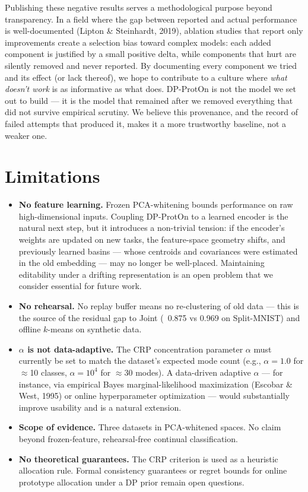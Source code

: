 \documentclass[11pt,a4paper]{article}
\begin{document}
Publishing these negative results serves a methodological purpose beyond transparency. In a field where the gap between reported and actual performance is well-documented (Lipton \& Steinhardt, 2019), ablation studies that report only improvements create a selection bias toward complex models: each added component is justified by a small positive delta, while components that hurt are silently removed and never reported. By documenting every component we tried and its effect (or lack thereof), we hope to contribute to a culture where \textit{what doesn't work} is as informative as what does. DP-ProtOn is not the model we set out to build --- it is the model that remained after we removed everything that did not survive empirical scrutiny. We believe this provenance, and the record of failed attempts that produced it, makes it a more trustworthy baseline, not a weaker one.

\section{Limitations}

\begin{itemize}[leftmargin=*]
\item \textbf{No feature learning.} Frozen PCA-whitening bounds performance on raw high-dimensional inputs. Coupling DP-ProtOn to a learned encoder is the natural next step, but it introduces a non-trivial tension: if the encoder's weights are updated on new tasks, the feature-space geometry shifts, and previously learned basins — whose centroids and covariances were estimated in the old embedding — may no longer be well-placed. Maintaining editability under a drifting representation is an open problem that we consider essential for future work.
\item \textbf{No rehearsal.} No replay buffer means no re-clustering of old data — this is the source of the residual gap to Joint (~0.875 vs 0.969 on Split-MNIST) and offline $k$-means on synthetic data.
\item \textbf{$\alpha$ is not data-adaptive.} The CRP concentration parameter $\alpha$ must currently be set to match the dataset's expected mode count (e.g., $\alpha{=}1.0$ for $\approx$10 classes, $\alpha{=}10^4$ for $\approx$30 modes). A data-driven adaptive $\alpha$ — for instance, via empirical Bayes marginal-likelihood maximization (Escobar \& West, 1995) or online hyperparameter optimization — would substantially improve usability and is a natural extension.
\item \textbf{Scope of evidence.} Three datasets in PCA-whitened spaces. No claim beyond frozen-feature, rehearsal-free continual classification.
\item \textbf{No theoretical guarantees.} The CRP criterion is used as a heuristic allocation rule. Formal consistency guarantees or regret bounds for online prototype allocation under a DP prior remain open questions.
\end{itemize}
\end{document}
